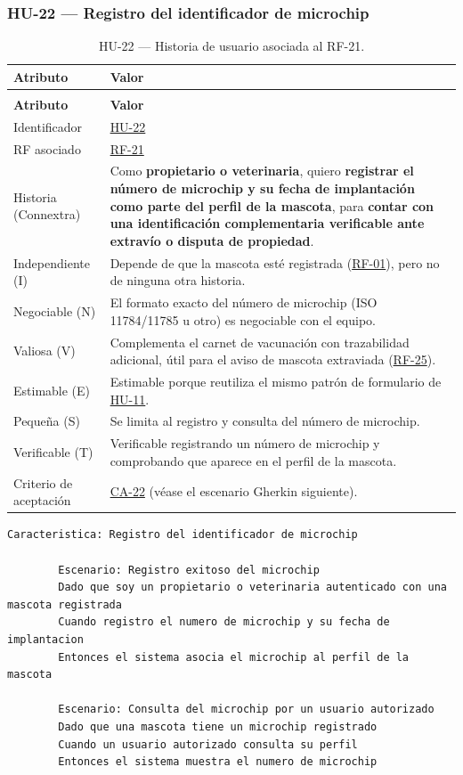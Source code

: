 \documentclass[journal,onecolumn]{IEEEtran}
\makeatletter
\newenvironment{atributos}[2]{%
	\small
	\begin{longtable}{@{}>{\raggedright\arraybackslash}p{4.2cm} >{\raggedright\arraybackslash}p{11.2cm}@{}}
		\caption{#2}\label{tab:#1}\\
		\toprule
		\textbf{Atributo} & \textbf{Valor} \\
		\midrule
		\endfirsthead
		\multicolumn{2}{@{}l}{\small\itshape (continuación)}\\
		\toprule
		\textbf{Atributo} & \textbf{Valor} \\
		\midrule
		\endhead
		\bottomrule
		\endlastfoot
	}{%
	\end{longtable}
	\normalsize
}
\makeatother
\begin{document}
	\subsubsection{HU-22 --- Registro del identificador de microchip}
	
	\begin{atributos}{HU-22}{HU-22 --- Historia de usuario asociada al RF-21.}
		Identificador & \hyperref[tab:HU-22]{HU-22} \\
		RF asociado & \hyperref[tab:RF-21]{RF-21} \\
		Historia (Connextra) & Como \textbf{propietario o veterinaria}, quiero \textbf{registrar el número de microchip y su fecha de implantación como parte del perfil de la mascota}, para \textbf{contar con una identificación complementaria verificable ante extravío o disputa de propiedad}. \\
		Independiente (I) & Depende de que la mascota esté registrada (\hyperref[tab:RF-01]{RF-01}), pero no de ninguna otra historia. \\
		Negociable (N) & El formato exacto del número de microchip (ISO 11784/11785 u otro) es negociable con el equipo. \\
		Valiosa (V) & Complementa el carnet de vacunación con trazabilidad adicional, útil para el aviso de mascota extraviada (\hyperref[tab:RF-25]{RF-25}). \\
		Estimable (E) & Estimable porque reutiliza el mismo patrón de formulario de \hyperref[tab:HU-11]{HU-11}. \\
		Pequeña (S) & Se limita al registro y consulta del número de microchip. \\
		Verificable (T) & Verificable registrando un número de microchip y comprobando que aparece en el perfil de la mascota. \\
		Criterio de aceptación & \hyperref[lst:ca22]{CA-22} (véase el escenario Gherkin siguiente). \\
	\end{atributos}
	
	\begin{lstlisting}[style=gherkin,caption={CA-22 --- Escenario de aceptación de la historia HU-22.},label={lst:ca22}]
		Caracteristica: Registro del identificador de microchip
		
		Escenario: Registro exitoso del microchip
		Dado que soy un propietario o veterinaria autenticado con una mascota registrada
		Cuando registro el numero de microchip y su fecha de implantacion
		Entonces el sistema asocia el microchip al perfil de la mascota
		
		Escenario: Consulta del microchip por un usuario autorizado
		Dado que una mascota tiene un microchip registrado
		Cuando un usuario autorizado consulta su perfil
		Entonces el sistema muestra el numero de microchip
	\end{lstlisting}
	
\end{document}
